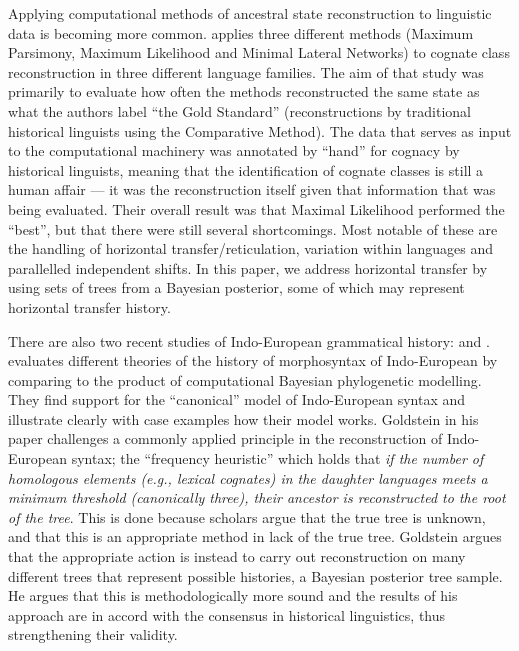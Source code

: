\documentclass[a4paper,10pt]{article} %
\begin{document}
Applying computational methods of ancestral state reconstruction to linguistic data is becoming more common. \citet{jager2018using} applies three different methods (Maximum Parsimony, Maximum Likelihood and Minimal Lateral Networks) to cognate class reconstruction in three different language families. The aim of that study was primarily to evaluate how often the methods reconstructed the same state as what the authors label ``the Gold Standard'' (reconstructions by traditional historical linguists using the Comparative Method). The data that serves as input to the computational machinery was annotated by ``hand'' for cognacy by historical linguists, meaning that the identification of cognate classes is still a human affair --- it was the reconstruction itself given that information that was being evaluated. Their overall result was that Maximal Likelihood performed the ``best'', but that there were still several shortcomings. Most notable of these are the handling of horizontal transfer/reticulation, variation within languages and parallelled independent shifts. In this paper, we address horizontal transfer by using sets of trees from a Bayesian posterior, some of which may represent horizontal transfer history.

There are also two recent studies of Indo-European grammatical history: \citet{carling2021reconstructing} and \citet{goldstein_2022}. \citet{carling2021reconstructing} evaluates different theories of the history of morphosyntax of Indo-European by comparing to the product of computational Bayesian phylogenetic modelling. They find support for the ``canonical'' model of Indo-European syntax and illustrate clearly with case examples how their model works. Goldstein in his paper challenges a commonly applied principle in the reconstruction of Indo-European syntax; the ``frequency heuristic'' which holds that \emph{if the number of homologous elements (e.g., lexical cognates) in the daughter languages meets a minimum threshold (canonically three), their ancestor is reconstructed to the root of the tree}\citep[1/71]{goldstein_2022}. This is done because scholars argue that the true tree is unknown, and that this is an appropriate method in lack of the true tree. Goldstein argues that the appropriate action is instead to carry out reconstruction on many different trees that represent possible histories, a Bayesian posterior tree sample. He argues that this is methodologically more sound and the results of his approach are in accord with the consensus in historical linguistics, thus strengthening their validity.
\end{document}

